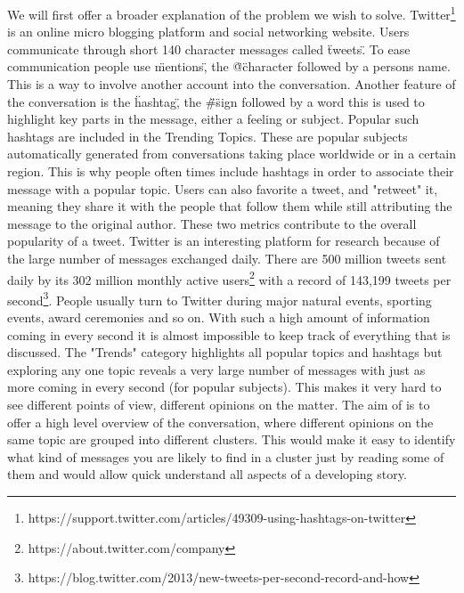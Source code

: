 We will first offer a broader explanation of the problem we wish to solve.
\newline
Twitter\footnote{https://support.twitter.com/articles/49309-using-hashtags-on-twitter} is an online micro blogging platform and social networking website. Users communicate through short 140 character messages called \"tweets\". To ease communication people use \"mentions\", the \"@\" character followed by a persons name. This is a way to involve another account into the conversation. Another feature of the conversation is the \"hashtag\", the \"\#\" sign followed by a word this is used to highlight key parts in the message, either a feeling or subject. Popular such hashtags are included in the Trending Topics. These are popular subjects automatically generated from conversations taking place worldwide or in a certain region. This is why people often times include hashtags in order to associate their message with a popular topic. Users can also favorite a tweet, and "retweet" it, meaning they share it with the people that follow them while still attributing the message to the original author. These two metrics contribute to the overall popularity of a tweet.
\newline
\newline
Twitter is an interesting platform for research because of the large number of messages exchanged daily. There are 500 million tweets sent daily by its 302 million monthly active users\footnote{https://about.twitter.com/company} with a record of 143,199 tweets per second\footnote{https://blog.twitter.com/2013/new-tweets-per-second-record-and-how}. People usually turn to Twitter during major natural events, sporting events, award ceremonies and so on. With such a high amount of information coming in every second it is almost impossible to keep track of everything that is discussed.
\newline
\newline
The "Trends" category highlights all popular topics and hashtags but exploring any one topic reveals a very large number of messages with just as more coming in every second (for popular subjects). This makes it very hard to see different points of view, different opinions on the matter. The aim of {\project}  is to offer a high level overview of the conversation, where different opinions on the same topic are grouped into different clusters. This would make it easy to identify what kind of messages you are likely to find in a cluster just by reading some of them and would allow quick understand all aspects of a developing story.

